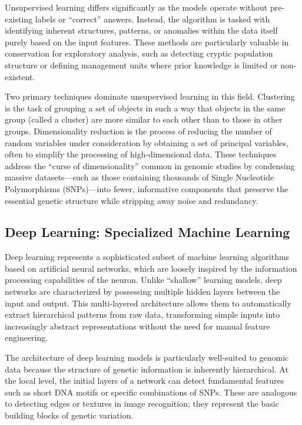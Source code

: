 Unsupervised learning differs significantly as the models operate without pre-existing labels or ``correct'' answers. Instead, the algorithm is tasked with identifying inherent structures, patterns, or anomalies within the data itself purely based on the input features. These methods are particularly valuable in conservation for exploratory analysis, such as detecting cryptic population structure or defining management units where prior knowledge is limited or non-existent.

Two primary techniques dominate unsupervised learning in this field. Clustering is the task of grouping a set of objects in such a way that objects in the same group (called a cluster) are more similar to each other than to those in other groups. Dimensionality reduction is the process of reducing the number of random variables under consideration by obtaining a set of principal variables, often to simplify the processing of high-dimensional data. These techniques address the ``curse of dimensionality'' common in genomic studies by condensing massive datasets—such as those containing thousands of Single Nucleotide Polymorphisms (SNPs)—into fewer, informative components that preserve the essential genetic structure while stripping away noise and redundancy.

\subsection{Deep Learning: Specialized Machine Learning}

Deep learning represents a sophisticated subset of machine learning algorithms based on artificial neural networks, which are loosely inspired by the information processing capabilities of the neuron. Unlike ``shallow'' learning models, deep networks are characterized by possessing multiple hidden layers between the input and output. This multi-layered architecture allows them to automatically extract hierarchical patterns from raw data, transforming simple inputs into increasingly abstract representations without the need for manual feature engineering.

The architecture of deep learning models is particularly well-suited to genomic data because the structure of genetic information is inherently hierarchical. At the local level, the initial layers of a network can detect fundamental features such as short DNA motifs or specific combinations of SNPs. These are analogous to detecting edges or textures in image recognition; they represent the basic building blocks of genetic variation.

